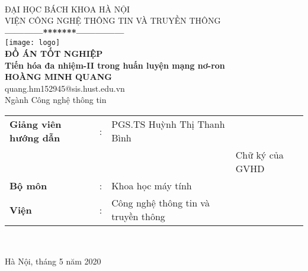 \thispagestyle{empty}

\thisfancypage{
  \setlength{\fboxrule}{1pt}
  \doublebox}{}
\begin{center}

{\\
{
\fontsize{12}{12}\selectfont ĐẠI HỌC BÁCH KHOA HÀ NỘI\\VIỆN CÔNG NGHỆ THÔNG TIN VÀ TRUYỀN THÔNG}\\
\textbf{------------*******---------------}\\[1cm]
\texttt{[image: logo]}
\centering
\\[1cm]
{\fontsize{25}{43}\selectfont \textbf{ĐỒ ÁN TỐT NGHIỆP}}\\[0.2cm]
{\fontsize{20}{26}\selectfont \textbf{Tiến hóa đa nhiệm-II trong huấn luyện mạng nơ-ron}}\\[0.4cm]
{\fontsize{14}{20}\selectfont \textbf{HOÀNG MINH QUANG} \\
\fontsize{12}{18}\selectfont quang.hm152945@sis.hust.edu.vn}\\[0.4cm]

{\fontsize{17}{10}\selectfont Ngành Công nghệ thông tin}\\[1cm]


\begin{tabular}{l c l l}
  \textbf{Giảng viên hướng dẫn} & : &  PGS.TS Huỳnh Thị Thanh Bình & \text{\_\_\_\_\_\_\_\_\_\_\_\_\_} \\
  & & & \fontsize{10}{12}\selectfont Chữ ký của GVHD\\
  \textbf{Bộ môn} & : &  Khoa học máy tính \\
  \textbf{Viện} & : &  Công nghệ thông tin và truyền thông \\
\end{tabular} \\[1.6cm]
}

\fontsize{17}{19}\selectfont Hà Nội, tháng 5 năm 2020
\end{center}
\pagebreak
